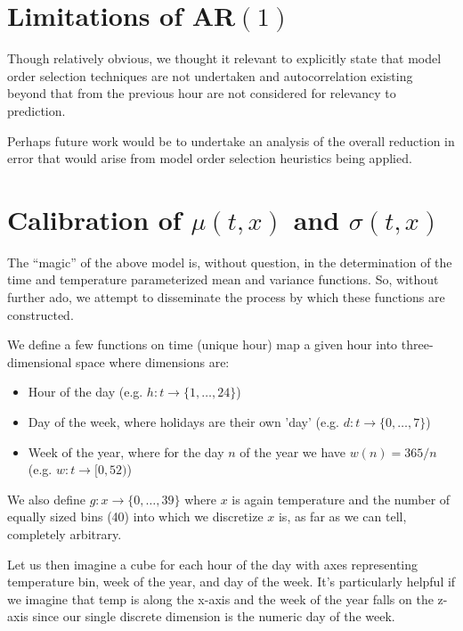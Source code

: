 \documentclass[11pt, a4paper]{article}
\begin{document}
\section{Limitations of AR$(1)$}

Though relatively obvious, we thought it relevant to explicitly state
that model order selection techniques are not undertaken and
autocorrelation existing beyond that from the previous hour are not
considered for relevancy to prediction.

Perhaps future work would be to undertake an analysis of the overall
reduction in error that would arise from model order selection
heuristics being applied.

\section{Calibration of $\mu(t,x)$ and $\sigma(t,x)$}

The ``magic'' of the above model is, without question, in the
determination of the time and temperature parameterized mean and
variance functions.  So, without further ado, we attempt to
disseminate the process by which these functions are constructed.

We define a few functions on time (unique hour) map a given hour into
three-dimensional space where dimensions are:
\begin{itemize}
\item Hour of the day (e.g. $h: t \rightarrow \{1, \dots, 24\}$)
\item Day of the week, where holidays are their own 'day' (e.g. $d: t
  \rightarrow \{0, \dots, 7\}$)
\item Week of the year, where for the day $n$ of the year we have
  $w(n) = 365/n$ (e.g. $w: t \rightarrow [0,52)$)
\end{itemize}
We also define $g:x \rightarrow \{0, \dots, 39\}$ where $x$ is again
temperature and the number of equally sized bins (40) into which we
discretize $x$ is, as far as we can tell, completely arbitrary.

Let us then imagine a cube for each hour of the day with axes
representing temperature bin, week of the year, and day of the week.
It's particularly helpful if we imagine that temp is along the x-axis
and the week of the year falls on the z-axis since our single discrete
dimension is the numeric day of the week.  
\end{document}
